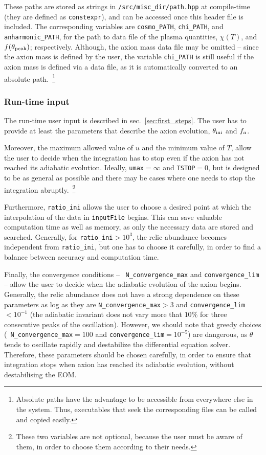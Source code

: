 \documentclass[11pt,a4paper]{article}
\begin{document}
These paths are stored as strings in {\tt \mimes/src/misc\_dir/path.hpp} at compile-time (they are defined as {\tt constexpr}), and can be accessed once this header file is included. The corresponding variables are {\tt cosmo\_PATH}, {\tt chi\_PATH}, and {\tt anharmonic\_PATH}, for the path to data file of the plasma quantities, $\chi(T)$, and $f(\theta_{\rm peak}{})$; respectively. Although, the axion mass data file may be omitted -- since the axion mass is defined by the user, the variable {\tt chi\_PATH} is still useful if the axion mass is defined via a data file, as it is automatically converted to an absolute path.~\footnote{Absolute paths have the advantage to be accessible from everywhere else in the system. Thus, executables that seek the corresponding files can be called and copied easily.}




\subsubsection{Run-time input}\label{sec:run_time_input}
%
The run-time user input is described in sec.~\ref{sec:first_steps}. The user has to provide at least the parameters that describe the axion evolution, $\theta_{\rm ini}{}$ and $f_{a}{}$. 

Moreover,  the maximum allowed value of $u$ and the minimum value of $T$, allow the user to decide when the integration has to stop even if the axion has not reached its adiabatic evolution. Ideally, {\tt umax}$=\infty$ and {\tt TSTOP}$=0$, but \mimes is designed to be as general as possible and there may be cases where one needs to stop the integration abruptly.~\footnote{These two variables are not optional, because the user must be aware of them, in order to choose them according to their needs.}

Furthermore, {\tt ratio\_ini} allows the user to choose a desired point at which the interpolation of the data in {\tt inputFile} begins. This can save valuable computation time as well as memory, as only the necessary data are stored and searched. Generally, for {\tt ratio\_ini}$>10^{3}$, the relic abundance becomes
independent from  {\tt ratio\_ini}, but one has to choose it carefully, in order to find a balance between accuracy and computation time.

Finally, the convergence conditions -- \ie~{\tt N\_convergence\_max} and {\tt convergence\_lim} -- allow the user to decide when the adiabatic evolution of the axion begins. Generally, the relic abundance does not have a strong dependence on these parameters as log as they are  {\tt N\_convergence\_max}$>3$ and {\tt convergence\_lim}$<10^{-1}$ (\ie the adiabatic invariant does not vary more that $10\%$ for three consecutive peaks of the oscillation). 
%
However, we should note that greedy choices (\eg~{\tt N\_convergence\_max}$=100$ and {\tt convergence\_lim}$=10^{-5}$) are dangerous, as $\theta$ tends to oscillate rapidly and destabilize the differential equation solver. Therefore, these parameters should be chosen carefully, in order to ensure that integration stops when axion has reached its adiabatic evolution, without destabilising the EOM.
\end{document}
